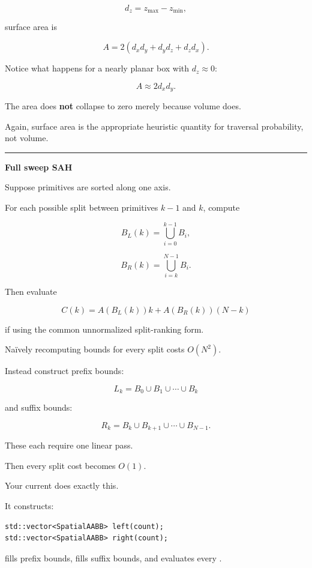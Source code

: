 \[
d_z=z_{\max}-z_{\min},
\]

surface area is

\[
\boxed{
A=2(d_xd_y+d_yd_z+d_zd_x).
}
\]

Notice what happens for a nearly planar box with \(d_z\approx0\):

\[
A\approx2d_xd_y.
\]

The area does \textbf{not} collapse to zero merely because volume does.

Again, surface area is the appropriate heuristic quantity for traversal probability, not volume.

\begin{center}\rule{0.5\linewidth}{0.5pt}\end{center}

\textbf{Full sweep SAH}

Suppose primitives are sorted along one axis.

For each possible split between primitives \(k-1\) and \(k\), compute

\[
B_L(k)
=
\bigcup_{i=0}^{k-1}B_i,
\]

\[
B_R(k)
=
\bigcup_{i=k}^{N-1}B_i.
\]

Then evaluate

\[
C(k)
=
A(B_L(k))k+
A(B_R(k))(N-k)
\]

if using the common unnormalized split-ranking form.

Naïvely recomputing bounds for every split costs \(O(N^2)\).

Instead construct prefix bounds:

\[
L_k=B_0\cup B_1\cup\cdots\cup B_k
\]

and suffix bounds:

\[
R_k=B_k\cup B_{k+1}\cup\cdots\cup B_{N-1}.
\]

These each require one linear pass.

Then every split cost becomes \(O(1)\).

Your current  does exactly this.

It constructs:

\begin{verbatim}
std::vector<SpatialAABB> left(count);
std::vector<SpatialAABB> right(count);
\end{verbatim}

fills prefix bounds, fills suffix bounds, and evaluates every .

